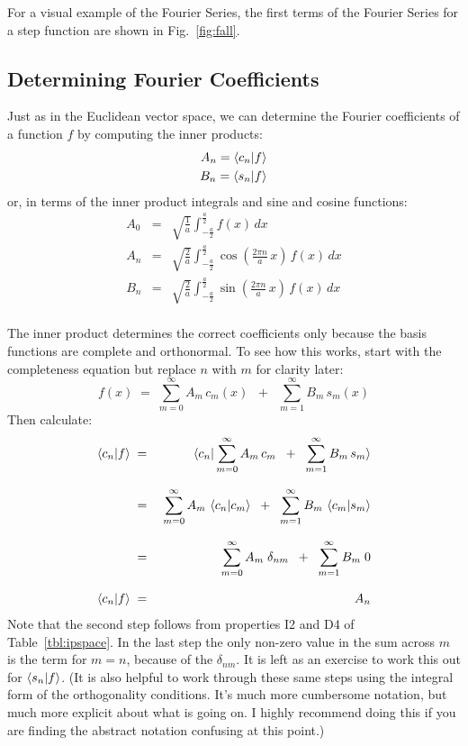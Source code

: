 \documentclass[12pt]{book}
\begin{document}
For a visual example of the Fourier Series, the first terms of the Fourier Series for a step function are shown in Fig.~\ref{fig:fall}.  

\subsection{Determining Fourier Coefficients}
\label{sect:coeff}

Just as in the Euclidean vector space, we can determine the Fourier coefficients of a function $f$ by computing the inner products:
\begin{eqnarray*}
A_n = \braket{c_n| f} \\
B_n = \braket{s_n| f}
\end{eqnarray*}
or, in terms of the inner product integrals and sine and cosine functions:
\begin{eqnarray*}
A_0 &=& \sqrt{\frac{1}{a}} \int_{-\frac{a}{2}}^{\frac{a}{2}} f(x) \, dx \\
A_n &=& \sqrt{\frac{2}{a}} \int_{-\frac{a}{2}}^{\frac{a}{2}} 
\cos\left(\frac{2\pi n}{a} \, x \right) \, f(x) \, dx \\
B_n &=& \sqrt{\frac{2}{a}} \int_{-\frac{a}{2}}^{\frac{a}{2}} 
\sin\left(\frac{2\pi n}{a} \, x \right) \, f(x) \, dx \\
\end{eqnarray*}


The inner product determines the correct coefficients only because the basis functions are complete and orthonormal.  To see how this works, start with the completeness equation but replace $n$ with $m$ for clarity later:
\begin{equation*}
f(x) \; = \; \sum_{m=0}^{\infty}  A_m \, c_m(x)  \; \; + \; \; \sum_{m=1}^{\infty} B_m \, s_m(x)
\end{equation*}
Then calculate:
\begin{eqnarray*}
  \braket{c_n| f} \; &=& \; \braket{c_n | \sum_{m=0}^{\infty}  A_m \, c_m  \; \; + \; \; \sum_{m=1}^{\infty} B_m \, s_m }\\[8pt]
  &=& \; \sum_{m=0}^{\infty}  A_m \, \braket{c_n| c_m}  \; \; + \; \; \sum_{m=1}^{\infty} B_m \, \braket{c_m| s_m} \\[8pt]
 &=& \; \sum_{m=0}^{\infty}  A_m \; \delta_{nm}  \; \; + \; \; \sum_{m=1}^{\infty} B_m \; 0 \\[8pt]
\braket{c_n| f} \; &=& A_n \\
\end{eqnarray*}
Note that the second step follows from properties I2 and D4 of
Table~\ref{tbl:ipspace}.  In the last step the only non-zero value in
the sum across $m$ is the term for $m=n$, because of the
$\delta_{nm}$.  It is left as an exercise to work this out for
$\braket{s_n | f}$.  (It is also helpful to work through these same
steps using the integral form of the orthogonality conditions.  It's
much more cumbersome notation, but much more explicit about what is
going on.  I highly recommend doing this if you are finding the
abstract notation confusing at this point.)
\end{document}

